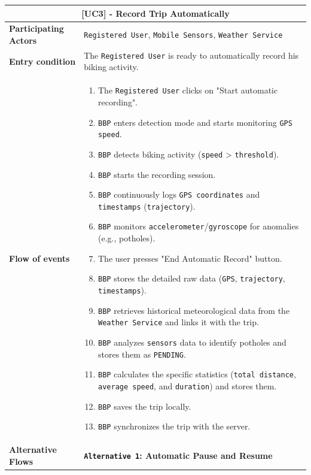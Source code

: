 \begin{table}[H]
\centering
\begin{tabularx}{\textwidth}{|l|X|}
\hline
\multicolumn{2}{|c|}{\textbf{[UC3] - Record Trip Automatically}} \\ \hline
\textbf{Participating Actors} & \texttt{Registered User}, \texttt{Mobile Sensors}, \texttt{Weather Service} \\ \hline
\textbf{Entry condition}      & The \texttt{Registered User} is ready to automatically record his biking activity. \\ \hline
\textbf{Flow of events}       & 
\begin{enumerate}
    \item The \texttt{Registered User} clicks on "Start automatic recording".
    \item \texttt{BBP} enters detection mode and starts monitoring \texttt{GPS speed}.
    \item \texttt{BBP} detects biking activity (\texttt{speed} > \texttt{threshold}).
    \item \texttt{BBP} starts the recording session.
    \item \texttt{BBP} continuously logs \texttt{GPS coordinates} and \texttt{timestamps} (\texttt{trajectory}).
    \item \texttt{BBP} monitors \texttt{accelerometer}/\texttt{gyroscope} for anomalies (e.g., potholes).
    \item The user presses "End Automatic Record" button.
    \item \texttt{BBP} stores the detailed raw data (\texttt{GPS}, \texttt{trajectory}, \texttt{timestamps}).
    \item \texttt{BBP} retrieves historical meteorological data from the \texttt{Weather Service} and links it with the trip.
    \item \texttt{BBP} analyzes \texttt{sensors} data to identify potholes and stores them as \texttt{PENDING}.
    \item \texttt{BBP} calculates the specific statistics (\texttt{total distance}, \texttt{average speed}, and \texttt{duration}) and stores them.
    \item \texttt{BBP} saves the trip locally.
    \item \texttt{BBP} synchronizes the trip with the server.
\end{enumerate} \\ \hline
\textbf{Alternative Flows}    & 
\textbf{\texttt{Alternative 1}: Automatic Pause and Resume} \newline

\end{tabularx}
\end{table}
